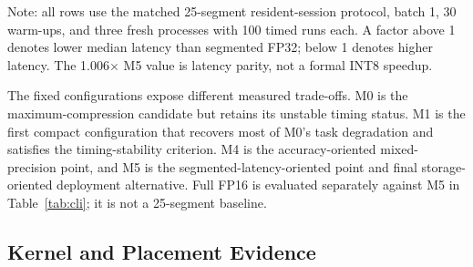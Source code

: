 \documentclass[conference]{IEEEtran}
\begin{document}
\begin{table}[t]
\caption{Topology-Matched Performance of the 25-Segment Configurations}
\label{tab:performance}
\centering
\small
{}
\parbox{\textwidth}{\footnotesize Note: all rows use the matched 25-segment resident-session protocol, batch 1, 30 warm-ups, and three fresh processes with 100 timed runs each. A factor above 1 denotes lower median latency than segmented FP32; below 1 denotes higher latency. The 1.006$\times$ M5 value is latency parity, not a formal INT8 speedup.}
\end{table}

The fixed configurations expose different measured trade-offs. M0 is the maximum-compression candidate but retains its unstable timing status. M1 is the first compact configuration that recovers most of M0's task degradation and satisfies the timing-stability criterion. M4 is the accuracy-oriented mixed-precision point, and M5 is the segmented-latency-oriented point and final storage-oriented deployment alternative. Full FP16 is evaluated separately against M5 in Table~\ref{tab:cli}; it is not a 25-segment baseline.

\subsection{Kernel and Placement Evidence}
\end{document}
